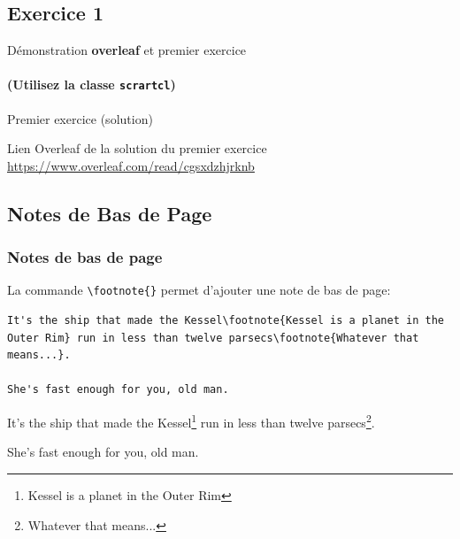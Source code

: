 \subsection{Exercice 1}

\begin{frame}[fragile]{Démonstration \textbf{overleaf} et premier exercice}
  \framesubtitle{\alert{(Utilisez la classe \texttt{scrartcl})}}
  \begin{center}
  \end{center}
\end{frame}

\begin{frame}[fragile]{Premier exercice (solution)}
  \begin{center}
  Lien Overleaf de la solution du premier exercice \url{https://www.overleaf.com/read/cgsxdzhjrknb}
  \end{center}
\end{frame}

\subsection{Notes de Bas de Page}

\begin{frame}[fragile]
  \frametitle{Notes de bas de page}
  La commande \lstinline|\footnote{}| permet d'ajouter une note de bas de page:
  \begin{lstlisting}[style=nonumbers]
It's the ship that made the Kessel\footnote{Kessel is a planet in the Outer Rim} run in less than twelve parsecs\footnote{Whatever that means...}.

She's fast enough for you, old man.
  \end{lstlisting}
  \begin{minipage}{\textwidth}
    It's the ship that made the Kessel\footnote{Kessel is a planet in the Outer Rim} run in less than twelve parsecs\footnote{Whatever that means...}.

    She's fast enough for you, old man.
  \end{minipage}
\end{frame}

